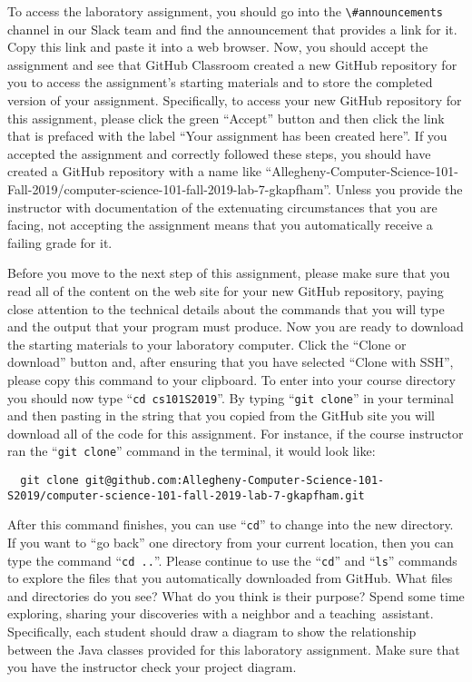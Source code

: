 \documentclass[11pt]{article}
\newcommand{\command}[1]{``\lstinline{#1}''}
\newcommand{\channel}[1]{\lstinline{#1}}
\newcommand{\step}[1]{``{#1}''}
\begin{document}
To access the laboratory assignment, you should go into the
\channel{\#announcements} channel in our Slack team and find the announcement
that provides a link for it. Copy this link and paste it into a web browser.
Now, you should accept the assignment and see that GitHub Classroom created a
new GitHub repository for you to access the assignment's starting materials and
to store the completed version of your assignment. Specifically, to access your
new GitHub repository for this assignment, please click the green ``Accept''
button and then click the link that is prefaced with the label ``Your assignment
has been created here''. If you accepted the assignment and correctly followed
these steps, you should have created a GitHub repository with a name like
``Allegheny-Computer-Science-101-Fall-2019/computer-science-101-fall-2019-lab-7-gkapfham''.
Unless you provide the instructor with documentation of the extenuating
circumstances that you are facing, not accepting the assignment means that you
automatically receive a failing grade for it.

Before you move to the next step of this assignment, please make sure that you
read all of the content on the web site for your new GitHub repository, paying
close attention to the technical details about the commands that you will type
and the output that your program must produce. Now you are ready to download the
starting materials to your laboratory computer. Click the ``Clone or download''
button and, after ensuring that you have selected ``Clone with SSH'', please
copy this command to your clipboard. To enter into your course directory you
should now type \command{cd cs101S2019}. By typing \command{git clone} in your
terminal and then pasting in the string that you copied from the GitHub site you
will download all of the code for this assignment. For instance, if the course
instructor ran the \command{git clone} command in the terminal, it would look
like:

\begin{lstlisting}
  git clone git@github.com:Allegheny-Computer-Science-101-S2019/computer-science-101-fall-2019-lab-7-gkapfham.git
\end{lstlisting}

After this command finishes, you can use \command{cd} to change into the new
directory. If you want to \step{go back} one directory from your current
location, then you can type the command \command{cd ..}. Please continue to use
the \command{cd} and \command{ls} commands to explore the files that you
automatically downloaded from GitHub. What files and directories do you see?
What do you think is their purpose? Spend some time exploring, sharing your
discoveries with a neighbor and a \mbox{teaching assistant}. Specifically, each
student should draw a diagram to show the relationship between the Java classes
provided for this laboratory assignment. Make sure that you have the instructor
check your project diagram.
\end{document}
